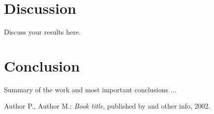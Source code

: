 \documentclass[journal]{IEEEtran}
\begin{document}
\section{Discussion}
Discuss your results here.

\section{Conclusion}
Summary of the work and most important conclusions ...

\begin{thebibliography}{1}

Author P., Author M.: \emph{Book title}, published by and other info, 2002.

\end{thebibliography}
\end{document}
